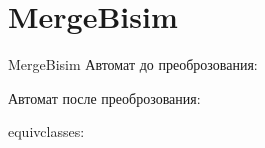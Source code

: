 \section{MergeBisim}
\begin{frame}{MergeBisim}
	Автомат до преоброзования:


	Автомат после преоброзования:


	equivclasses:


\end{frame}

